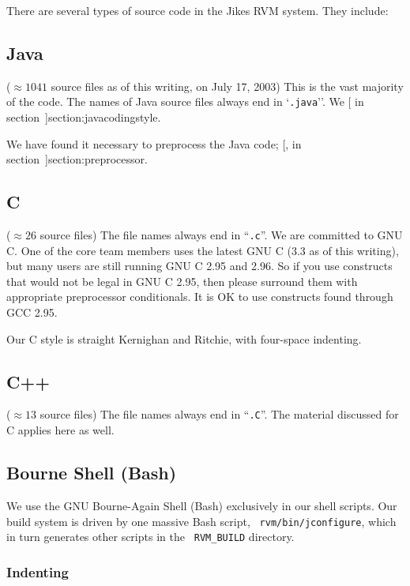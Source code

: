 There are several types of source code in the Jikes RVM system.  They
include:


\subsection{Java} 
($\approx 1041$ source files as of this writing, on July 17, 2003)  This is
the vast majority of the code.  The names of Java source files always end in
`{\tt .java}''.   We [ in
section~\Ref]{section:javacodingstyle}. 

We have found it necessary to preprocess the Java code; [, in section~\Ref]{section:preprocessor}.


\subsection {C}

($\approx 26$ source files)  The file names always
end in ``{\tt .c}''.  We are committed to GNU C.  One of the core team
members uses the latest GNU C (3.3 as of this writing), but many users
are still running GNU C 2.95 and 2.96.  So if you use constructs that
would not be legal in GNU C 2.95, then please surround them with
appropriate preprocessor conditionals.  It is OK to use constructs
found through GCC 2.95.

Our C style is straight Kernighan and Ritchie, with four-space
indenting.  

\subsection{C++} 

($\approx 13$ source files)  The file names always end in
``{\tt .C}''.   The material discussed for C applies here as well.

\subsection{Bourne Shell (Bash)}

We use the GNU Bourne-Again Shell (Bash) exclusively in our shell
scripts.  Our build system is driven by one massive Bash script, {\tt
rvm/bin/jconfigure}, which in turn generates other scripts in the {\tt
RVM\_BUILD} directory.

\subsubsection{Indenting}

